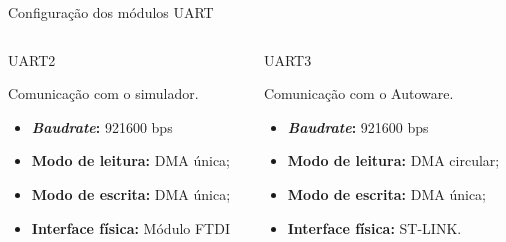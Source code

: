 \documentclass{if-beamer}
\begin{document}
\begin{frame}{Configuração dos módulos UART}
	
	\begin{columns}
		
		\begin{column}{0.5\textwidth}
			
			\begin{block}{UART2}
				
				Comunicação com o simulador.
				\begin{itemize}
					\item \textbf{\textit{Baudrate}:} 921600 bps
					\item \textbf{Modo de leitura:} DMA única;
					\item \textbf{Modo de escrita:} DMA única;
					\item \textbf{Interface física:} Módulo FTDI			
				\end{itemize}
				
			\end{block}
			
		\end{column}
	
\pause
		
		\begin{column}{0.5\textwidth}
			
			\begin{block}{UART3}
				
				Comunicação com o Autoware.
				\begin{itemize}
					\item \textbf{\textit{Baudrate}:} 921600 bps
					\item \textbf{Modo de leitura:} DMA circular;
					\item \textbf{Modo de escrita:} DMA única;
					\item \textbf{Interface física:} ST-LINK.
				\end{itemize}
				
			\end{block}
			
		\end{column}
		
	\end{columns}
	
\end{frame}
\end{document}
